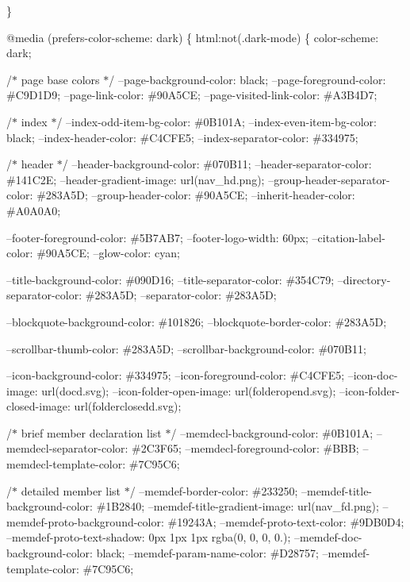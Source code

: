 \}

@media (prefers-\/color-\/scheme\+: dark) \{ html\+:not(.dark-\/mode) \{ color-\/scheme\+: dark;

/\texorpdfstring{$\ast$}{*} page base colors \texorpdfstring{$\ast$}{*}/ --page-\/background-\/color\+: black; --page-\/foreground-\/color\+: \#\+C9\+D1\+D9; --page-\/link-\/color\+: \#90A5\+CE; --page-\/visited-\/link-\/color\+: \#\+A3\+B4\+D7;

/\texorpdfstring{$\ast$}{*} index \texorpdfstring{$\ast$}{*}/ --index-\/odd-\/item-\/bg-\/color\+: \#0B101A; --index-\/even-\/item-\/bg-\/color\+: black; --index-\/header-\/color\+: \#\+C4\+CFE5; --index-\/separator-\/color\+: \#334975;

/\texorpdfstring{$\ast$}{*} header \texorpdfstring{$\ast$}{*}/ --header-\/background-\/color\+: \#070B11; --header-\/separator-\/color\+: \#141C2E; --header-\/gradient-\/image\+: url(\textquotesingle{}nav\+\_\+hd.\+png\textquotesingle{}); --group-\/header-\/separator-\/color\+: \#283A5D; --group-\/header-\/color\+: \#90A5\+CE; --inherit-\/header-\/color\+: \#\+A0\+A0\+A0;

--footer-\/foreground-\/color\+: \#5B7\+AB7; --footer-\/logo-\/width\+: 60px; --citation-\/label-\/color\+: \#90A5\+CE; --glow-\/color\+: cyan;

--title-\/background-\/color\+: \#090D16; --title-\/separator-\/color\+: \#354C79; --directory-\/separator-\/color\+: \#283A5D; --separator-\/color\+: \#283A5D;

--blockquote-\/background-\/color\+: \#101826; --blockquote-\/border-\/color\+: \#283A5D;

--scrollbar-\/thumb-\/color\+: \#283A5D; --scrollbar-\/background-\/color\+: \#070B11;

--icon-\/background-\/color\+: \#334975; --icon-\/foreground-\/color\+: \#\+C4\+CFE5; --icon-\/doc-\/image\+: url(\textquotesingle{}docd.\+svg\textquotesingle{}); --icon-\/folder-\/open-\/image\+: url(\textquotesingle{}folderopend.\+svg\textquotesingle{}); --icon-\/folder-\/closed-\/image\+: url(\textquotesingle{}folderclosedd.\+svg\textquotesingle{});

/\texorpdfstring{$\ast$}{*} brief member declaration list \texorpdfstring{$\ast$}{*}/ --memdecl-\/background-\/color\+: \#0B101A; --memdecl-\/separator-\/color\+: \#2C3\+F65; --memdecl-\/foreground-\/color\+: \#\+BBB; --memdecl-\/template-\/color\+: \#7C95\+C6;

/\texorpdfstring{$\ast$}{*} detailed member list \texorpdfstring{$\ast$}{*}/ --memdef-\/border-\/color\+: \#233250; --memdef-\/title-\/background-\/color\+: \#1B2840; --memdef-\/title-\/gradient-\/image\+: url(\textquotesingle{}nav\+\_\+fd.\+png\textquotesingle{}); --memdef-\/proto-\/background-\/color\+: \#19243A; --memdef-\/proto-\/text-\/color\+: \#9DB0\+D4; --memdef-\/proto-\/text-\/shadow\+: 0px 1px 1px rgba(0, 0, 0, 0.); --memdef-\/doc-\/background-\/color\+: black; --memdef-\/param-\/name-\/color\+: \#\+D28757; --memdef-\/template-\/color\+: \#7C95\+C6;

